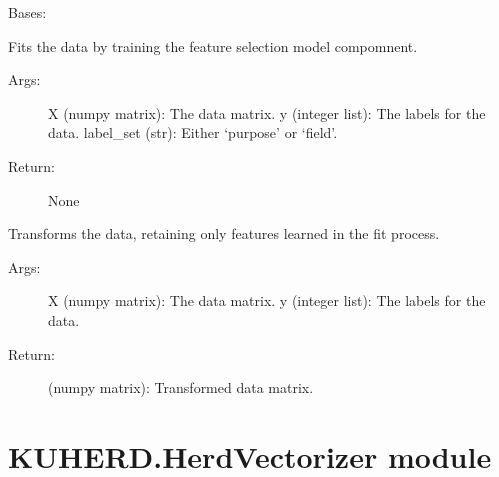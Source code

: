 \documentclass[letterpaper,10pt,english]{sphinxmanual}
\begin{document}
\begin{fulllineitems}
\label{\detokenize{KUHERD:KUHERD.FeatureSelector.FeatureSelector}}
Bases: 

\begin{fulllineitems}
\label{\detokenize{KUHERD:KUHERD.FeatureSelector.FeatureSelector.fit}}
Fits the data by training the feature selection model compomnent.
\begin{description}
\item[{Args:}] \leavevmode
X (numpy matrix): The data matrix.
y (integer list): The labels for the data.
label\_set (str): Either `purpose' or `field'.

\item[{Return:}] \leavevmode
None

\end{description}

\end{fulllineitems}


\begin{fulllineitems}
\label{\detokenize{KUHERD:KUHERD.FeatureSelector.FeatureSelector.transform}}
Transforms the data, retaining only features learned in the \sphinxquotedblleft{}fit\sphinxquotedblright{} process.
\begin{description}
\item[{Args:}] \leavevmode
X (numpy matrix): The data matrix.
y (integer list): The labels for the data.

\item[{Return:}] \leavevmode
(numpy matrix): Transformed data matrix.

\end{description}

\end{fulllineitems}


\end{fulllineitems}



\section{KUHERD.HerdVectorizer module}
\label{\detokenize{KUHERD:module-KUHERD.HerdVectorizer}}\label{\detokenize{KUHERD:kuherd-herdvectorizer-module}}
\end{document}
